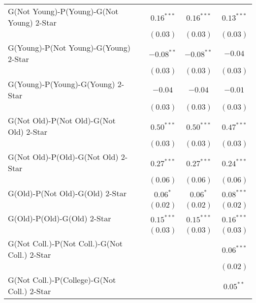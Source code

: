 \begin{center}
\begin{longtable}{l c c c c}
G(Not Young)-P(Young)-G(Not Young) 2-Star     &               & $0.16^{***}$  & $0.16^{***}$  & $0.13^{***}$  \\
                                              &               & $(0.03)$      & $(0.03)$      & $(0.03)$      \\
G(Young)-P(Not Young)-G(Young) 2-Star         &               & $-0.08^{**}$  & $-0.08^{**}$  & $-0.04$       \\
                                              &               & $(0.03)$      & $(0.03)$      & $(0.03)$      \\
G(Young)-P(Young)-G(Young) 2-Star             &               & $-0.04$       & $-0.04$       & $-0.01$       \\
                                              &               & $(0.03)$      & $(0.03)$      & $(0.03)$      \\
G(Not Old)-P(Not Old)-G(Not Old) 2-Star       &               & $0.50^{***}$  & $0.50^{***}$  & $0.47^{***}$  \\
                                              &               & $(0.03)$      & $(0.03)$      & $(0.03)$      \\
G(Not Old)-P(Old)-G(Not Old) 2-Star           &               & $0.27^{***}$  & $0.27^{***}$  & $0.24^{***}$  \\
                                              &               & $(0.06)$      & $(0.06)$      & $(0.06)$      \\
G(Old)-P(Not Old)-G(Old) 2-Star               &               & $0.06^{*}$    & $0.06^{*}$    & $0.08^{***}$  \\
                                              &               & $(0.02)$      & $(0.02)$      & $(0.02)$      \\
G(Old)-P(Old)-G(Old) 2-Star                   &               & $0.15^{***}$  & $0.15^{***}$  & $0.16^{***}$  \\
                                              &               & $(0.03)$      & $(0.03)$      & $(0.03)$      \\
G(Not Coll.)-P(Not Coll.)-G(Not Coll.) 2-Star &               &               &               & $0.06^{***}$  \\
                                              &               &               &               & $(0.02)$      \\
G(Not Coll.)-P(College)-G(Not Coll.) 2-Star   &               &               &               & $0.05^{**}$   \\

\end{longtable}
\end{center}
